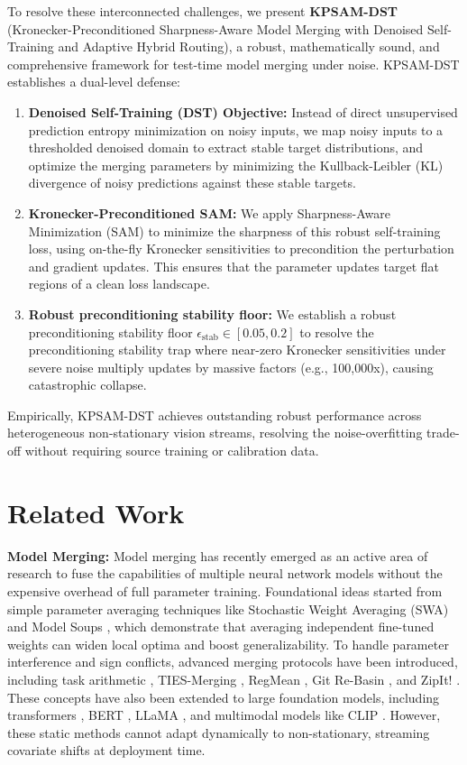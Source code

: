 \documentclass{article}
\theoremstyle{plain}
\theoremstyle{definition}
\theoremstyle{remark}
\begin{document}
To resolve these interconnected challenges, we present \textbf{KPSAM-DST} (Kronecker-Preconditioned Sharpness-Aware Model Merging with Denoised Self-Training and Adaptive Hybrid Routing), a robust, mathematically sound, and comprehensive framework for test-time model merging under noise. KPSAM-DST establishes a dual-level defense:
\begin{enumerate}
    \item \textbf{Denoised Self-Training (DST) Objective:} Instead of direct unsupervised prediction entropy minimization on noisy inputs, we map noisy inputs to a thresholded denoised domain to extract stable target distributions, and optimize the merging parameters by minimizing the Kullback-Leibler (KL) divergence of noisy predictions against these stable targets.
    \item \textbf{Kronecker-Preconditioned SAM:} We apply Sharpness-Aware Minimization (SAM) \cite{foret2021sharpness} to minimize the sharpness of this robust self-training loss, using on-the-fly Kronecker sensitivities to precondition the perturbation and gradient updates. This ensures that the parameter updates target flat regions of a clean loss landscape.
    \item \textbf{Robust preconditioning stability floor:} We establish a robust preconditioning stability floor $\epsilon_{\text{stab}} \in [0.05, 0.2]$ to resolve the preconditioning stability trap where near-zero Kronecker sensitivities under severe noise multiply updates by massive factors (e.g., 100,000x), causing catastrophic collapse.
\end{enumerate}

Empirically, KPSAM-DST achieves outstanding robust performance across heterogeneous non-stationary vision streams, resolving the noise-overfitting trade-off without requiring source training or calibration data.

\section{Related Work}
\label{sec:related}
\textbf{Model Merging:} Model merging has recently emerged as an active area of research to fuse the capabilities of multiple neural network models without the expensive overhead of full parameter training. Foundational ideas started from simple parameter averaging techniques like Stochastic Weight Averaging (SWA) and Model Soups \cite{wortsman2022model}, which demonstrate that averaging independent fine-tuned weights can widen local optima and boost generalizability. To handle parameter interference and sign conflicts, advanced merging protocols have been introduced, including task arithmetic \cite{ilharco2022editing}, TIES-Merging \cite{yadav2023ties}, RegMean \cite{jin2023regmean}, Git Re-Basin \cite{ainsworth2023git}, and ZipIt! \cite{stoica2023zipit}. These concepts have also been extended to large foundation models, including transformers \cite{vaswani2017attention}, BERT \cite{devlin2018bert}, LLaMA \cite{touvron2023llama}, and multimodal models like CLIP \cite{radford2021learning}. However, these static methods cannot adapt dynamically to non-stationary, streaming covariate shifts at deployment time.
\end{document}
